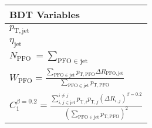 \begin{table}[!htb]
    \centering
    \caption{}
    \label{tab:bdt_variables}
    \begin{tabular}{l}
    \toprule
        BDT Variables \\
    \midrule
        $p_\mathrm{T, jet}$ \\
        $\eta_\mathrm{jet}$ \\
        \vspace{1em}
        $N_{\text {PFO }}=\sum_{\text {PFO } \in \text { jet }}$ \\
        \vspace{1em}
        $W_{\mathrm{PFO}}=\frac{\sum_{\mathrm{PFO} \in \mathrm{jet}} p_{\mathrm{T}, \mathrm{PFO}} \Delta R_{\mathrm{PFO}, \mathrm{jet}}}{\sum_{\mathrm{PFO} \in \mathrm{jet}} p_{\mathrm{T}, \mathrm{PFO}}}$ \\
        \vspace{1em}
        $C_1^{\beta=0.2}=\frac{\sum_{i, j \in \mathrm{jet}}^{i \neq j} p_{\mathrm{T}, i} p_{\mathrm{T}, j}\left(\Delta R_{i, j}\right)^{\beta=0.2}}{\left(\sum_{\mathrm{PFO} \in \mathrm{jet}} p_{\mathrm{T}, \mathrm{PFO}}\right)^2}$ \\
    \bottomrule
    \end{tabular}
\end{table}
    